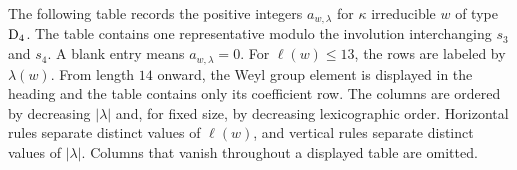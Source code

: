 \documentclass[a4paper]{amsart}
\theoremstyle{remark}
\numberwithin{equation}{section}
\begin{document}
The following table records the positive integers $a_{w,\lambda}$ for $\kappa$ irreducible $w$ of type $\mathrm{D}_{4}$. 
The table contains one representative modulo the involution interchanging
$s_3$ and $s_4$. A blank entry means $a_{w,\lambda}=0$. For $\ell(w)\leq 13$, the rows are labeled by $\lambda(w)$. From length $14$ onward, the Weyl group element
is displayed in the heading and the table contains only its coefficient row.
The columns are ordered by decreasing
$|\lambda|$ and, for fixed size, by decreasing lexicographic order. Horizontal
rules separate distinct values of $\ell(w)$, and vertical rules separate
distinct values of $|\lambda|$. Columns that vanish throughout a displayed
table are omitted.
\par\medskip
\end{document}
